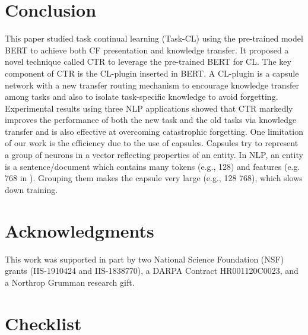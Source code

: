 \documentclass{article}
\begin{document}
\section{Conclusion}
{\color{black}This paper studied task continual learning (Task-CL) using the pre-trained model BERT to achieve both CF presentation and knowledge transfer.} 
It proposed a novel technique called CTR to leverage the pre-trained BERT for CL. The key component of CTR is the CL-plugin inserted in 
BERT. A CL-plugin is a capsule network with a new transfer routing mechanism to encourage knowledge transfer among tasks and also to isolate task-specific knowledge to avoid forgetting. Experimental results using three NLP applications showed that CTR markedly improves the performance of both the new task and the old tasks via knowledge transfer and is also effective at overcoming catastrophic forgetting. {\color{black}One limitation of our work is the efficiency due to the use of capsules. Capsules try to represent a group of neurons in a vector reflecting properties of an entity. In NLP, an entity is a sentence/document which contains many tokens (e.g., 128) and features (e.g. 768 in ). Grouping them makes the capsule very large (e.g., 128  768), which slows down training.}

\section*{Acknowledgments}
{\color{black}This work was supported in part by two National Science Foundation (NSF) grants (IIS-1910424 and IIS-1838770), a DARPA Contract HR001120C0023, and a Northrop Grumman research gift.} 

















\iffalse
\section*{Checklist}
\end{document}
